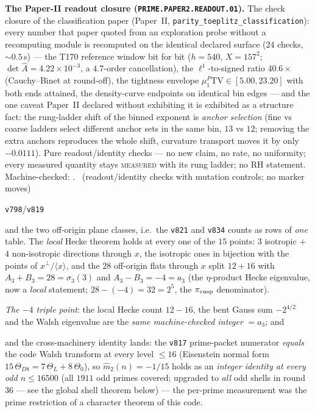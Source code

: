 \par\smallskip\noindent\textbf{The Paper-II readout closure
(\texttt{PRIME.PAPER2.READOUT.01}).}
The check closure of the classification paper (Paper~II,
\texttt{parity\_toeplitz\_classification}): every number that paper
quoted from an exploration probe without a recomputing module is
recomputed on the identical declared surface ($24$ checks,
${\sim}0.5$\,s) --- the T170 reference window bit for bit ($h=540$,
$X=157^{2}$; $\det\hat A=4.22\times10^{-3}$, a $4.7$-order
cancellation), the $\ell^{1}$-to-signed ratio $40.6\times$
(Cauchy--Binet at round-off), the tightness envelope
$\mu^{P}_{1}\mathrm{TV}\in[5.00,23.20]$ with both ends attained, the
density-curve endpoints on identical bin edges --- and the one caveat
Paper~II declared without exhibiting it is exhibited as a structure
fact: the rung-ladder shift of the binned exponent is \emph{anchor
selection} (fine vs coarse ladders select different anchor sets in
the same bin, $13$ vs $12$; removing the extra anchors reproduces the
whole shift, curvature transport moves it by only $-0.0111$). Pure
readout/identity checks --- no new claim, no rate, no uniformity; every
measured quantity stays \textsc{measured} with its rung ladder; no RH
statement.
Machine-checked:
.
\mE\ (readout/identity checks with mutation controls; no marker moves)


\texttt{v798}/\texttt{v819}

and the two off-origin plane classes, i.e.\ the \texttt{v821} and
\texttt{v834} counts as rows of \emph{one} table.  The
\emph{local} Hecke theorem holds at every one of the $15$ points:
$3$ isotropic $+$ $4$ non-isotropic directions through $x$, the
isotropic ones in bijection with the points of
$x^{\perp}/\langle x\rangle$, and the $28$ off-origin flats
through $x$ split $12 + 16$ with $A_3 + B_3 = 28 = \sigma_3(3)$
and $A_3 - B_3 = -4 = a_3$ (the $\eta$-product Hecke eigenvalue,
now a \emph{local} statement; $28 - (-4) = 32 = 2^5$, the
$\pi_{\rm cusp}$ denominator).  

\emph{The $-4$ triple point}: the local Hecke count $12 - 16$,
the bent Gauss sum $-2^{4/2}$ and the Walsh eigenvalue are the
\emph{same machine-checked integer} $= a_3$; and 

and the
cross-machinery identity lands: the \texttt{v817} prime-packet
numerator \emph{equals} the code Walsh transform at every level
$\le 16$ (Eisenstein normal form $15\,\Theta_{D8} = 7\,\Theta_L
+ 8\,\Theta_0$), so $\hat m_2(n) = -1/15$ holds as an
\emph{integer identity at every odd $n \le 16500$} (all $1911$
odd primes covered; upgraded to \emph{all} odd shells in round
36 --- see the global shell theorem below) --- the per-prime
measurement was the prime
restriction of a character theorem of this code.
